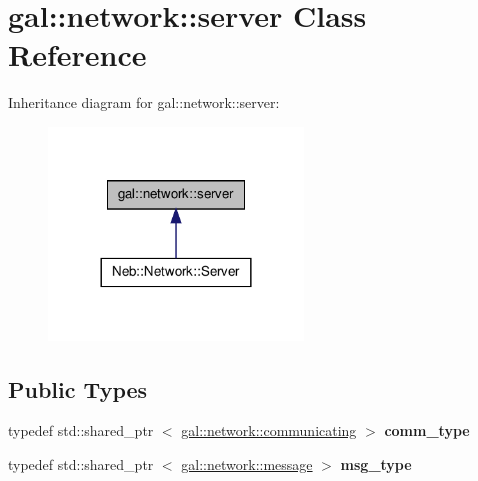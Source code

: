 \hypertarget{classgal_1_1network_1_1server}{\section{gal\-:\-:network\-:\-:server \-Class \-Reference}
\label{classgal_1_1network_1_1server}
}


\-Inheritance diagram for gal\-:\-:network\-:\-:server\-:\nopagebreak
\begin{figure}[H]
\begin{center}
\leavevmode
\includegraphics[width=192pt]{classgal_1_1network_1_1server__inherit__graph}
\end{center}
\end{figure}
\subsection*{\-Public \-Types}
\begin{DoxyCompactItemize}
\item 
\hypertarget{classgal_1_1network_1_1server_acbafca892f88a98a240d1451c9701aba}{typedef std\-::shared\-\_\-ptr\*
$<$ \hyperlink{classgal_1_1network_1_1communicating}{gal\-::network\-::communicating} $>$ {\bfseries comm\-\_\-type}}\label{classgal_1_1network_1_1server_acbafca892f88a98a240d1451c9701aba}

\item 
\hypertarget{classgal_1_1network_1_1server_a4efd79e0ef406678f3f99bae5c50a9a8}{typedef std\-::shared\-\_\-ptr\*
$<$ \hyperlink{classgal_1_1network_1_1message}{gal\-::network\-::message} $>$ {\bfseries msg\-\_\-type}}\label{classgal_1_1network_1_1server_a4efd79e0ef406678f3f99bae5c50a9a8}

\end{DoxyCompactItemize}
